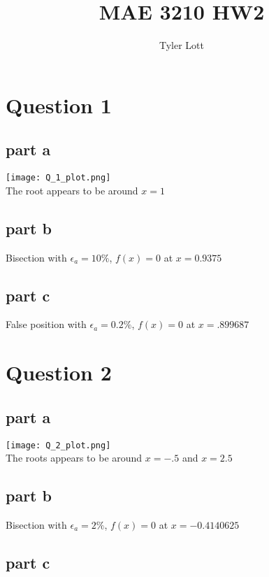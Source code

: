 \documentclass[11pt]{article} %
\title{MAE 3210  HW2}
\author{Tyler Lott}
\begin{document}
\maketitle

\section{Question 1}

\subsection{part a}

\texttt{[image: Q\_1\_plot.png]} \\
The root appears to be around $x=1$

\subsection{part b}

Bisection with $\epsilon_a = 10\%$, $ f(x) = 0$ at $ x = 0.9375 $

\subsection{part c}

False position with $\epsilon_a = 0.2\%$, $f(x) = 0$ at $x = .899687$

\section{Question 2}

\subsection{part a}

\texttt{[image: Q\_2\_plot.png]} \\
The roots appears to be around $x=-.5$ and $x=2.5$

\subsection{part b}

Bisection with $\epsilon_a = 2\%$,  $ f(x) = 0$ at $x = -0.4140625$

\subsection{part c}
\end{document}
